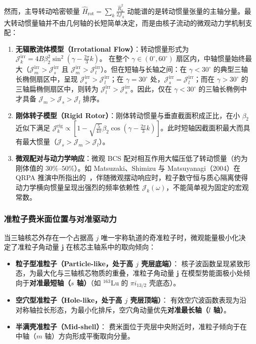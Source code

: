 然而，主导转动哈密顿量 $\hat{H}_{\mathrm{rot}} = \sum_{k} \frac{\hat{R}_k^2}{2\mathcal{J}_k}$ 动能谱的是转动惯量张量的主轴分量。最大转动惯量轴并不由几何轴的长短简单决定，而是由核子流动的微观动力学机制支配：
\begin{enumerate}
\item \textbf{无辐散流体模型（Irrotational Flow）}：转动惯量形式为 $\mathcal{J}_k^{\mathrm{irr}} = 4 B \beta_2^2 \sin^2\left(\gamma - \frac{2\pi}{3} k\right)$。
在整个 $\gamma \in (0^\circ, 60^\circ)$ 扇区内，中轴惯量始终最大（$\mathcal{J}_m^{\mathrm{irr}} > \mathcal{J}_s^{\mathrm{irr}}$ 且 $\mathcal{J}_m^{\mathrm{irr}} > \mathcal{J}_l^{\mathrm{irr}}$）。但在短轴与长轴之间：在 $\gamma < 30^\circ$ 的典型三轴长椭侧扇区中，呈现 $\mathcal{J}_s^{\mathrm{irr}} > \mathcal{J}_l^{\mathrm{irr}}$；在 $\gamma = 30^\circ$ 处，$\mathcal{J}_s^{\mathrm{irr}} = \mathcal{J}_l^{\mathrm{irr}}$；而在 $\gamma > 30^\circ$ 的三轴扁椭侧扇区中，则转为 $\mathcal{J}_l^{\mathrm{irr}} > \mathcal{J}_s^{\mathrm{irr}}$。因此，仅在 $\gamma < 30^\circ$ 的三轴长椭例中才具备 $\mathcal{J}_m > \mathcal{J}_s > \mathcal{J}_l$ 排序。
\item \textbf{刚体转子模型（Rigid Rotor）}：刚体转动惯量与垂直截面积成正比，在小 $\beta_2$ 近似下满足 $\mathcal{J}_k^{\mathrm{rig}} \propto [1 - \sqrt{\frac{5}{4\pi}}\beta_2 \cos(\gamma - \frac{2\pi}{3} k)]$。此时短轴因截面积最大而具有最大惯量（$\mathcal{J}_s > \mathcal{J}_m > \mathcal{J}_l$）。
\item \textbf{微观配对与动力学响应}：微观 BCS 配对相互作用大幅压低了转动惯量（约为刚体值的 $30\%$--$50\%$）。如 Matsuzaki、Shimizu 与 Matsuyanagi（2004）在 QRPA 推演中所指出的~\cite{matsuzaki-2004-nuclear-inertia-and-wobbling}，伴随微观摆动响应时，粒子数守恒与质心隔离使得动力学横向惯量呈现出强烈的频率依赖性 $\mathcal{J}_k(\omega)$，不能简单视为固定的宏观常数。
\end{enumerate}

\subsubsection{准粒子费米面位置与对准驱动力}

当三轴核芯外存在一个占据高 $j$ 唯一宇称轨道的奇准粒子时，微观能量极小化决定了准粒子角动量 $\mathbf{j}$ 在核芯主轴系中的取向倾向：
\begin{itemize}
\item \textbf{粒子型准粒子（Particle-like，处于高 $j$ 壳层底端）}：
核子波函数呈现紧致形态，为最大化与三轴核芯物质的重叠，准粒子角动量 $\mathbf{j}$ 在模型势能面极小处倾向于\textbf{对准最短轴（$s$ 轴）}（如 $^{163}\mathrm{Lu}$ 的 $\pi i_{13/2}$ 壳底态）。
\item \textbf{空穴型准粒子（Hole-like，处于高 $j$ 壳层顶端）}：
有效空穴波函数表现为沿对称轴拉长形态，为最小化排斥，空穴角动量优先\textbf{对准最长轴（$l$ 轴）}。
\item \textbf{半满壳准粒子（Mid-shell）}：
费米面位于壳层中央附近时，准粒子倾向于在中轴（$m$ 轴）方向形成平衡取向分量。
\end{itemize}

